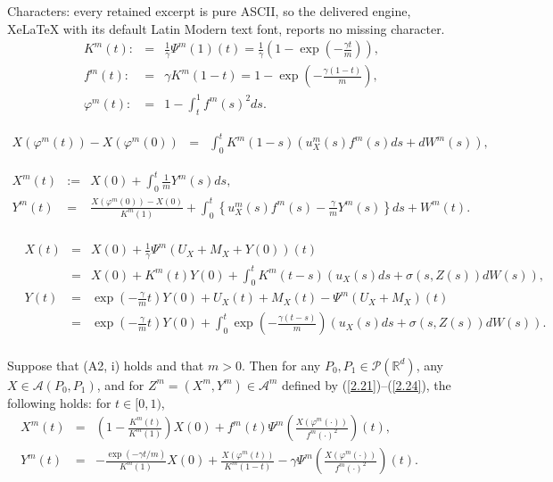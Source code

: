 \documentclass[10pt,a4paper]{amsart}
\begin{document}
Characters: every retained excerpt is pure ASCII, so the delivered engine, XeLaTeX with its default Latin Modern text font, reports no missing character.
\begin{eqnarray}
K^m(t):&=&\frac{1}{\gamma}\Psi^{m} (1)(t)=\frac{1}{\gamma}
\left(1- \exp\left(-\frac{\gamma t}{m}\right)\right),\label{3.7}\\
f^m(t):&=&\gamma K^m (1-t)=1- \exp\left(-\frac{\gamma (1-t)}{m}\right),\label{2.12}\\
\varphi^m(t):&=&1-\int_t^1 f^m(s)^2ds.\label{3.27}
\end{eqnarray}

\begin{eqnarray}\label{3.23}
X(\varphi^m(t))-X(\varphi^m(0))
&=&\int_{0}^{t}K^m(1-s)(u_X^m(s)f^m(s)ds +d W^m(s)),\qquad%
\end{eqnarray}

\begin{eqnarray}
X^m(t)&:=&X(0)+\int_0^t \frac{1}{m}Y^m(s)ds, \label{2.21}\\
Y^m(t)&=&\frac{X(\varphi^m(0))-X(0)}{K^m(1)}
+\int_0^t \left\{u_X^m(s)f^m(s)- \frac{\gamma}{m}Y^m(s)\right\}ds+W^m(t).\nonumber\\
\label{2.24}
\end{eqnarray}

\begin{eqnarray}
\quad X(t)&=&X(0)+\frac{1}{\gamma}\Psi^{m} (U_X+M_X+Y(0))(t)\label{3.8}\\
&=&X(0)+K^m(t)Y(0)+\int_0^tK^m(t-s)(u_X(s)ds+ \sigma(s,Z(s))dW(s)),\label{3.9}\\
\quad Y(t)&=&\exp \left(-\frac{\gamma}{m}t\right)Y(0)+U_X(t)+M_X(t)-\Psi^{m} (U_X+M_X)(t)\label{3.10}\\
&=&\exp \left(-\frac{\gamma}{m}t\right)Y(0)+\int_{0}^{t}\exp\left(-\frac{\gamma (t-s)}{m}\right)(u_X(s)ds +\sigma(s,Z(s))dW(s)).\nonumber\\
\label{3.11}
\end{eqnarray}

\begin{lemma}\label{lm3.6}
Suppose that (A2, i) holds and that $m>0$.
Then  for any $P_0,P_1\in\mathcal{P}(\mathbb{R}^d)$, 
any $X\in\mathcal{A}(P_0,P_1)$, and for $Z^m=(X^m, Y^m)\in \mathcal{A}^{m}$ defined by (\ref{2.21})--(\ref{2.24}), the following holds:
for $t\in [0,1)$,
\begin{eqnarray}
X^m(t)&=&\left(1-\frac{K^m(t)}{K^m(1)}\right)X(0)
+f^m(t)\Psi^m\left(\frac{X(\varphi^m(\cdot))}{f^m(\cdot)^2}\right)(t),\label{3.26}\\
Y^m(t)&=&-\frac{\exp(-\gamma t/m)}{K^m(1)}X(0)
+\frac{X(\varphi^m(t))}{K^m(1-t)}
-\gamma\Psi^m\left(\frac{X(\varphi^m(\cdot))}{f^m(\cdot)^2}\right)(t).\qquad\label{2.27}
\end{eqnarray}
\end{lemma}
\end{document}
